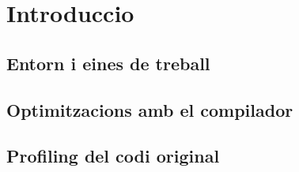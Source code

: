 \chapter{Introduccio}

\section{Entorn i eines de treball}

\section{Optimitzacions amb el compilador}

\section{Profiling del codi original}
